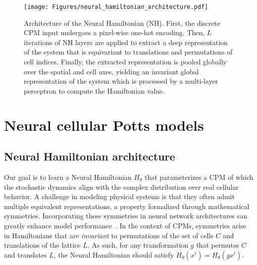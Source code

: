 \begin{figure*}[t]
    \centering
    \texttt{[image: Figures/neural\_hamiltonian\_architecture.pdf]}
    \label{fig:model-blueprint}
    \caption{Architecture of the Neural Hamiltonian (NH). First, the discrete CPM input undergoes a pixel-wise one-hot encoding. Then, $L$ iterations of NH layers are applied to extract a deep representation of the system that is equivariant to translations and permutations of cell indices.
    Finally, the extracted representation is pooled globally over the spatial and cell axes, yielding an invariant global representation of the system which is processed by a multi-layer perceptron to compute the Hamiltonian value.}
    \label{fig:neural-hamiltonian}
\end{figure*}


\section{Neural cellular Potts models}\label{sec:method}

\subsection{Neural Hamiltonian architecture}

Our goal is to learn a Neural Hamiltonian $H_\theta$ that parameterizes a CPM of which the stochastic dynamics align with the complex distribution over real cellular behavior. A challenge in modeling physical systems is that they often admit multiple equivalent representations, a property formalized through mathematical symmetries. Incorporating these symmetries in neural network architectures can greatly enhance model performance~\cite{bronstein2021geometric}. In the context of CPMs, symmetries arise in Hamiltonians that are \emph{invariant} to permutations of the set of cells $C$ and translations of the lattice $L$. As such, for any transformation $g$ that permutes $C$ and translates $L$, the Neural Hamiltonian should satisfy $H_\theta(x^t) = H_\theta(gx^t)$. 





